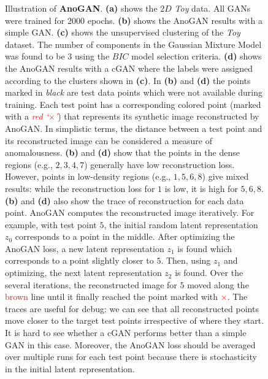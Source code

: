 \documentclass{article} %
\begin{document}
\begin{figure}[h]
	\caption{Illustration of {\bf AnoGAN}. {\bf (a)} shows the $2D$ {\em Toy} data. All GANs were trained for $2000$ epochs. {\bf (b)} shows the AnoGAN results with a simple GAN. {\bf (c)} shows the unsupervised clustering of the {\em Toy} dataset. The number of components in the Gaussian Mixture Model was found to be $3$ using the $BIC$ model selection criteria. {\bf (d)} shows the AnoGAN results with a cGAN where the labels were assigned according to the clusters shown in {\bf (c)}. In {\bf (b)} and {\bf (d)} the points marked in {\em black} are test data points which were not available during training. Each test point has a corresponding colored point (marked with a \textit{\textcolor{red}{red `$\times$'}}) that represents its synthetic image reconstructed by AnoGAN. In simplistic terms, the distance between a test point and its reconstructed image can be considered a measure of anomalousness. {\bf (b)} and {\bf (d)} show that the points in the dense regions (e.g., $2, 3, 4, 7$) generally have low reconstruction loss. However, points in low-density regions (e.g., $1, 5, 6, 8$) give mixed results: while the reconstruction loss for $1$ is low, it is high for $5, 6, 8$. {\bf (b)} and {\bf (d)} also show the trace of reconstruction for each data point. AnoGAN computes the reconstructed image iteratively. For example, with test point $5$, the initial random latent representation $z_0$ corresponds to a point in the middle. After optimizing the AnoGAN loss, a new latent representation $z_1$ is found which corresponds to a point slightly closer to $5$. Then, using $z_1$ and optimizing, the next latent representation $z_2$ is found. Over the several iterations, the reconstructed image for $5$ moved along the \textcolor{brown}{brown} line until it finally reached the point marked with \textcolor{red}{$\times$}. The traces are useful for debug: we can see that all reconstructed points move closer to the target test points irrespective of where they start. It is hard to see whether a cGAN performs better than a simple GAN in this case. Moreover, the AnoGAN loss should be averaged over multiple runs for each test point because there is stochasticity in the initial latent representation.}
	\label{fig:ano_gan}
\end{figure}
\end{document}
